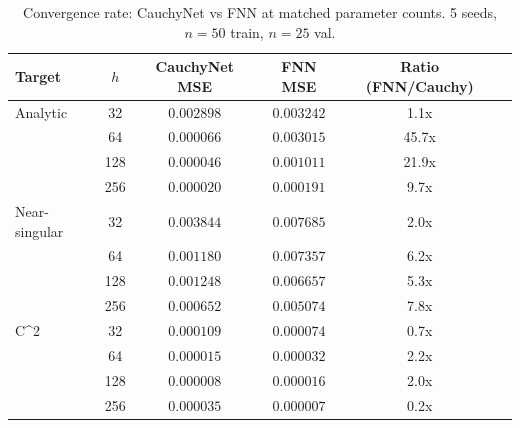 \begin{table}[ht]\centering
\caption{Convergence rate: CauchyNet vs FNN at matched parameter counts. 5 seeds, $n=50$ train, $n=25$ val.}
\label{tab:convergence}
\begin{tabular}{lccccc}
\toprule
Target & $h$ & CauchyNet MSE & FNN MSE & Ratio (FNN/Cauchy) \\
\midrule
Analytic & 32 & $0.002898$ & $0.003242$ & 1.1x \\
 & 64 & $0.000066$ & $0.003015$ & 45.7x \\
 & 128 & $0.000046$ & $0.001011$ & 21.9x \\
 & 256 & $0.000020$ & $0.000191$ & 9.7x \\
\midrule
Near-singular & 32 & $0.003844$ & $0.007685$ & 2.0x \\
 & 64 & $0.001180$ & $0.007357$ & 6.2x \\
 & 128 & $0.001248$ & $0.006657$ & 5.3x \\
 & 256 & $0.000652$ & $0.005074$ & 7.8x \\
\midrule
C^2 & 32 & $0.000109$ & $0.000074$ & 0.7x \\
 & 64 & $0.000015$ & $0.000032$ & 2.2x \\
 & 128 & $0.000008$ & $0.000016$ & 2.0x \\
 & 256 & $0.000035$ & $0.000007$ & 0.2x 
\bottomrule
\end{tabular}
\end{table}